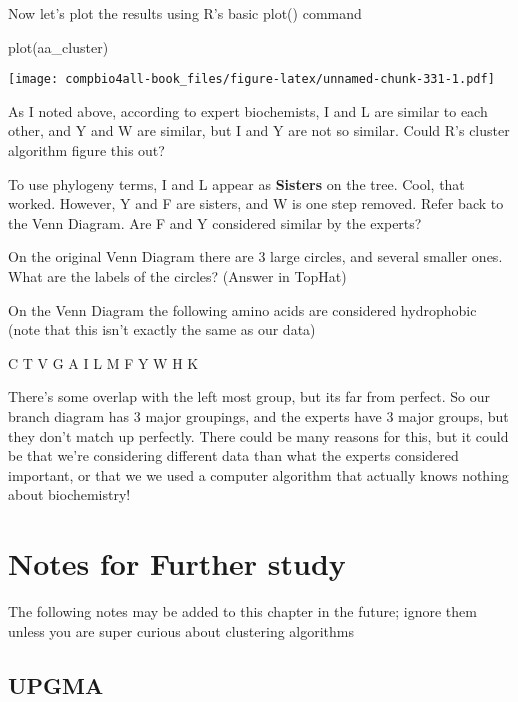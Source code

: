 \documentclass[
]{book}
\newenvironment{Shaded}{\begin{snugshade}}{\end{snugshade}}
\newcommand{\FunctionTok}[1]{\textcolor[rgb]{0.00,0.00,0.00}{#1}}
\newcommand{\NormalTok}[1]{#1}
\begin{document}
Now let's plot the results using R's basic plot() command

\begin{Shaded}
\begin{Highlighting}[]
\FunctionTok{plot}\NormalTok{(aa\_cluster)}
\end{Highlighting}
\end{Shaded}

\texttt{[image: compbio4all-book\_files/figure-latex/unnamed-chunk-331-1.pdf]}

As I noted above, according to expert biochemists, I and L are similar to each other, and Y and W are similar, but I and Y are not so similar. Could R's cluster algorithm figure this out?

To use phylogeny terms, I and L appear as \textbf{Sisters} on the tree. Cool, that worked. However, Y and F are sisters, and W is one step removed. Refer back to the Venn Diagram. Are F and Y considered similar by the experts?

On the original Venn Diagram there are 3 large circles, and several smaller ones. What are the labels of the circles? (Answer in TopHat)

On the Venn Diagram the following amino acids are considered hydrophobic (note that this isn't exactly the same as our data)

C T V G A I L M F Y W H K

There's some overlap with the left most group, but its far from perfect. So our branch diagram has 3 major groupings, and the experts have 3 major groups, but they don't match up perfectly. There could be many reasons for this, but it could be that we're considering different data than what the experts considered important, or that we we used a computer algorithm that actually knows nothing about biochemistry!

\hypertarget{notes-for-further-study}{%
\section{Notes for Further study}\label{notes-for-further-study}}

The following notes may be added to this chapter in the future; ignore them unless you are super curious about clustering algorithms

\hypertarget{upgma}{%
\subsection{UPGMA}\label{upgma}}
\end{document}
